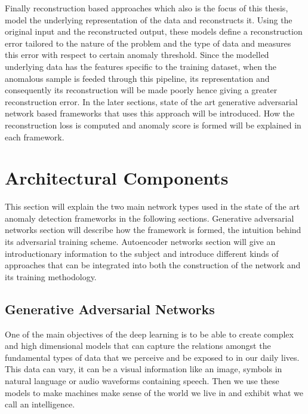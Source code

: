 Finally reconstruction based approaches which also is the focus of this thesis, model the underlying
representation of the data and reconstructs it. Using the original input and the reconstructed
output, these models define a reconstruction error tailored to the nature of the problem and the
type of data and measures this error with respect to certain anomaly threshold. Since the modelled
underlying data has the features specific to the training dataset, when the anomalous sample is
feeded through this pipeline, its representation and consequently its reconstruction will be made
poorly hence giving a greater reconstruction error. In the later sections, state of the art
generative adversarial network based frameworks that uses this approach will be introduced. How the
reconstruction loss is computed and anomaly score is formed will be explained in each framework.


\section{Architectural Components}

This section will explain the two main network types used in the state of the art anomaly detection
frameworks in the following sections. Generative adversarial networks section will describe how the
framework is formed, the intuition behind its adversarial training scheme. Autoencoder networks
section will give an introductionary information to the subject and introduce different kinds of
approaches that can be integrated into both the construction of the network and its training
methodology. 

\subsection{Generative Adversarial Networks}
\label{sec:gan}

One of the main objectives of the deep learning is to be able to create complex and high dimensional
models that can capture the relations amongst the fundamental types of data that we perceive and be
exposed to in our daily lives. This data can vary, it can be a visual information like an image,
symbols in natural language or audio waveforms containing speech. Then we use these models to make
machines make sense of the world we live in and exhibit what we call an intelligence.
\cite{Bengio:2009:LDA:1658423.1658424}



